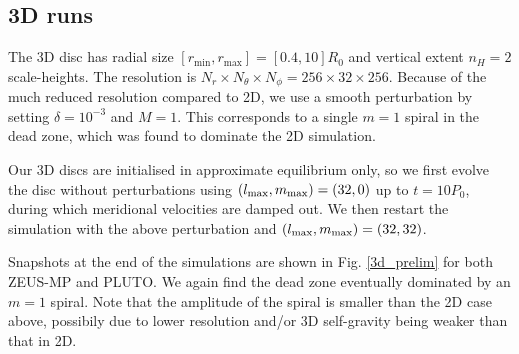 \subsection{3D runs}
The 3D disc has radial size 
$[r_\mathrm{min},r_\mathrm{max}]=[0.4,10]R_0$ and vertical extent
$n_H=2$ scale-heights. The resolution is $N_r\times N_\theta\times
N_\phi=256\times32\times256$. Because of the much reduced resolution
compared to 2D, we use a smooth perturbation by setting
$\delta = 10^{-3}$ and $M=1$. This corresponds to a single $m=1$
spiral in the dead zone, which was found to dominate the 2D
simulation. 

Our 3D discs are initialised in approximate equilibrium only, so we
first evolve the disc without perturbations using  
$(l_\mathrm{max},m_\mathrm{max})=(32,0)$ up to $t=10P_0$, during which 
meridional velocities are damped out. We then restart the simulation
with the above perturbation and $(l_\mathrm{max},m_\mathrm{max})=(32,32)$. 

Snapshots at the end of the simulations are shown in
Fig. \ref{3d_prelim} for both ZEUS-MP and PLUTO. We again
find the dead zone eventually dominated by an $m=1$ spiral. Note that
the amplitude of the spiral is smaller than the 2D case above,
possibily due to lower resolution and/or 3D self-gravity being weaker
than that in 2D. 

